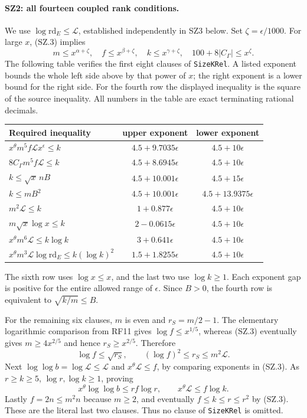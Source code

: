 \documentclass[11pt,a4paper]{article}
\numberwithin{equation}{section}
\theoremstyle{remark}\newtheorem{remark}[theorem]{Remark}
\begin{document}
\paragraph{SZ2: all fourteen coupled rank conditions.}
We use $\log\mathrm{rd}_E\leq\mathcal L$, established independently
in SZ3 below. Set $\zeta=\epsilon/1000$. For large $x$, (SZ.3)
implies
\[
 m\leq x^{\alpha+\zeta},\quad f\leq x^{\beta+\zeta},\quad
 k\leq x^{\gamma+\zeta},\quad
 100+8|C_\Gamma|\leq x^\zeta.                                 \tag{SZ.4}
\]
The following table verifies the first eight clauses of
\texttt{SizeKRel}. A listed exponent bounds the whole left side
above by that power of $x$; the right exponent is a lower bound for
the right side. For the fourth row the displayed inequality is the
square of the source inequality. All numbers in the table are exact
terminating rational decimals.
\begin{center}\small
\begin{tabular}{p{}cc}
Required inequality & upper exponent & lower exponent\\\hline
$x^\theta m^5f\mathcal L x^\epsilon\leq k$
 & $4.5+9.7035\epsilon$ & $4.5+10\epsilon$\\
$8C_\Gamma m^5f\mathcal L\leq k$
 & $4.5+8.6945\epsilon$ & $4.5+10\epsilon$\\
$k\leq\sqrt{x}\,nB$
 & $4.5+10.001\epsilon$ & $4.5+15\epsilon$\\
$k\leq mB^2$
 & $4.5+10.001\epsilon$ & $4.5+13.9375\epsilon$\\
$m^2\mathcal L\leq k$
 & $1+0.877\epsilon$ & $4.5+10\epsilon$\\
$m\sqrt{x}\log x\leq k$
 & $2-0.0615\epsilon$ & $4.5+10\epsilon$\\
$x^\theta m^6\mathcal L\leq k\log k$
 & $3+0.641\epsilon$ & $4.5+10\epsilon$\\
$x^\theta m^3\mathcal L\log\mathrm{rd}_E
                  \leq k(\log k)^2$
 & $1.5+1.8255\epsilon$ & $4.5+10\epsilon$
\end{tabular}
\end{center}
The sixth row uses $\log x\leq x$, and the last two use
$\log k\geq1$. Each exponent gap is positive for the entire allowed
range of $\epsilon$. Since $B>0$, the fourth row is equivalent to
$\sqrt{k/m}\leq B$.

For the remaining six clauses, $m$ is even and
$r_S=m/2-1$. The elementary logarithmic comparison from RF11 gives
$\log f\leq x^{1/5}$, whereas (SZ.3) eventually gives
$m\geq4x^{2/5}$ and hence $r_S\geq x^{2/5}$.
Therefore
\[
 \log f\leq\sqrt{r_S},\qquad
 (\log f)^2\leq r_S\leq m^2\mathcal L.
\]
Next $\log\log b=\log\mathcal L\leq\mathcal L$ and
$x^\theta\mathcal L\leq f$, by comparing exponents in (SZ.3).
As $r\geq k\geq5$, $\log r,\log k\geq1$, proving
\[
 x^\theta\log\log b\leq rf\log r,
       \qquad x^\theta\mathcal L\leq f\log k.
\]
Lastly $f=2n\leq m^2n$ because $m\geq2$, and eventually
$f\leq k\leq r\leq r^2$ by (SZ.3). These are the literal last two
clauses. Thus no clause of \texttt{SizeKRel} is omitted.
\end{document}
